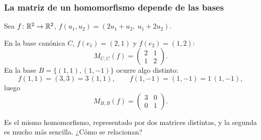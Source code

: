 
\begin{frame}
    \frametitle{La matriz de un homomorfismo depende de las bases}

    \begin{example}
        Sea $f\colon\mathbb{R}^2\to\mathbb{R}^2$, $f(u_1,u_2)=(2u_1+u_2,\ u_1+2u_2)$.
    \end{example}

    En la base canónica $C$, $f(e_1)=(2,1)$ y $f(e_2)=(1,2)$:
    \[
        M_{C,C}(f)=\begin{pmatrix}2&1\\1&2\end{pmatrix}.
    \]
    En la base $B=\{(1,1),(1,-1)\}$ ocurre algo distinto:
    \[
        f(1,1)=(3,3)=3\,(1,1),\qquad f(1,-1)=(1,-1)=1\,(1,-1),
    \]
    luego
    \[
        M_{B,B}(f)=\begin{pmatrix}3&0\\0&1\end{pmatrix}.
    \]

    \medskip

    Es \alert{el mismo} homomorfismo, representado por dos matrices
    distintas, y la segunda es mucho más sencilla. ¿Cómo se relacionan?
\end{frame}


